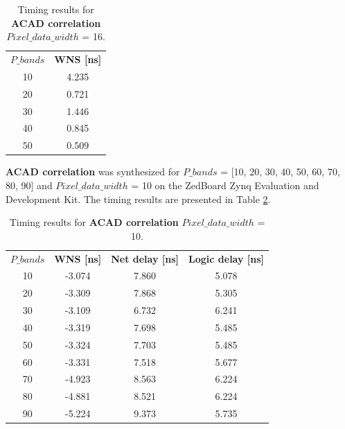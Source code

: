 \begin{table}[H]
    \centering
    \begin{tabular}{c|c}
    \textbf{$P\_bands$} &\textbf{WNS [ns]} \\
    10 & 4.235 \\
    20 & 0.721\\
    30 &1.446\\
    40 & 0.845 \\
    50 & 0.509 \\
    \end{tabular}%
    \caption{Timing results for \textbf{ACAD correlation} $Pixel\_data\_width$ = 16.}
    \label{tab:wns_correlation}
\end{table}

\textbf{ACAD correlation} was synthesized for $P\_bands$ = [10, 20, 30, 40, 50, 60, 70, 80, 90] and $Pixel\_data\_width$ = 10 on the ZedBoard Zynq Evaluation and Development Kit. The timing results are presented in Table \ref{tab:wns_correlation_10}.
\begin{table}[H]
    \centering
    \begin{tabular}{c|c|c|c}
    \textbf{$P\_bands$} &\textbf{WNS [ns]}& \textbf{Net delay [ns]}& \textbf{Logic delay [ns]} \\
    10 &-3.074 & 7.860 & 5.078 \\
    20 & -3.309& 7.868 & 5.305 \\
    30 & -3.109 & 6.732 & 6.241\\
    40 & -3.319 & 7.698 & 5.485 \\
    50 & -3.324 & 7.703 & 5.485 \\
    60 & -3.331 & 7.518 & 5.677 \\
    70 & -4.923 & 8.563 & 6.224 \\
    80 & -4.881 & 8.521 & 6.224 \\
    90 & -5.224 & 9.373 & 5.735 \\
    
    \end{tabular}%
    \caption{Timing results for \textbf{ACAD correlation} $Pixel\_data\_width$ = 10.}
    \label{tab:wns_correlation_10}
\end{table}


